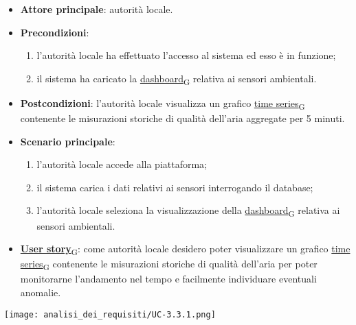 \begin{itemize}
	\item \textbf{Attore principale}: autorità locale.
	\item \textbf{Precondizioni}:
	      \begin{enumerate}
		      \item l'autorità locale ha effettuato l'accesso al sistema ed esso è in funzione;
		      \item il sistema ha caricato la \href{https://7last.github.io/docs/pb/documentazione-interna/glossario\#dashboard}{dashboard\textsubscript{G}} relativa ai sensori ambientali.
	      \end{enumerate}
	\item \textbf{Postcondizioni}: l'autorità locale visualizza un grafico \href{https://7last.github.io/docs/pb/documentazione-interna/glossario\#time-series}{time series\textsubscript{G}} contenente le misurazioni storiche
	      di qualità dell'aria aggregate per 5 minuti.
	\item \textbf{Scenario principale}:
	      \begin{enumerate}
		      \item l'autorità locale accede alla piattaforma;
		      \item il sistema carica i dati relativi ai sensori interrogando il database;
		      \item l'autorità locale seleziona la visualizzazione della \href{https://7last.github.io/docs/pb/documentazione-interna/glossario\#dashboard}{dashboard\textsubscript{G}} relativa ai sensori ambientali.
	      \end{enumerate}
	\item \href{https://7last.github.io/docs/pb/documentazione-interna/glossario\#user-story}{\textbf{User story}\textsubscript{G}}:
	      come autorità locale desidero poter visualizzare un grafico \href{https://7last.github.io/docs/pb/documentazione-interna/glossario\#time-series}{time series\textsubscript{G}} contenente le misurazioni storiche
	      di qualità dell'aria per poter monitorarne l'andamento nel tempo e facilmente individuare eventuali anomalie.
\end{itemize}
\begin{center}
	\texttt{[image: analisi\_dei\_requisiti/UC-3.3.1.png]}
\end{center}


